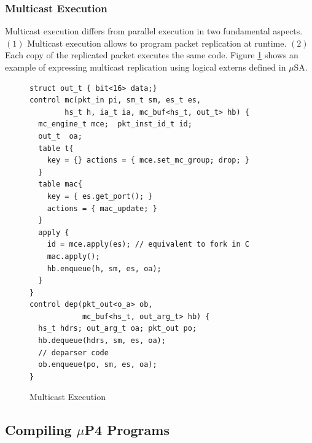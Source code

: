 \subsubsection{Multicast Execution}
\label{subsubsection:multicast-execution}
Multicast execution differs from parallel execution in two fundamental aspects.
$(1)$ Multicast execution allows to program packet replication at runtime.
$(2)$ Each copy of the replicated packet executes the same code.
Figure \ref{fig:multicast-execution} shows an example of expressing multicast replication using logical externs defined in $\mu$SA.
\begin{figure}[ht]
\begin{lstlisting}[frame=none]
struct out_t { bit<16> data;}
control mc(pkt_in pi, sm_t sm, es_t es, 
        hs_t h, ia_t ia, mc_buf<hs_t, out_t> hb) {
  mc_engine_t mce;  pkt_inst_id_t id; 
  out_t  oa;
  table t{
    key = {} actions = { mce.set_mc_group; drop; }
  }
  table mac{
    key = { es.get_port(); } 
    actions = { mac_update; }
  }
  apply {
    id = mce.apply(es); // equivalent to fork in C
    mac.apply();
    hb.enqueue(h, sm, es, oa);
  }
}
control dep(pkt_out<o_a> ob, 
            mc_buf<hs_t, out_arg_t> hb) {
  hs_t hdrs; out_arg_t oa; pkt_out po;
  hb.dequeue(hdrs, sm, es, oa);
  // deparser code 
  ob.enqueue(po, sm, es, oa);
}
\end{lstlisting}
\caption{Multicast Execution}
\label{fig:multicast-execution}
\end{figure}

\subsection{Compiling $\mu$P4 Programs}

